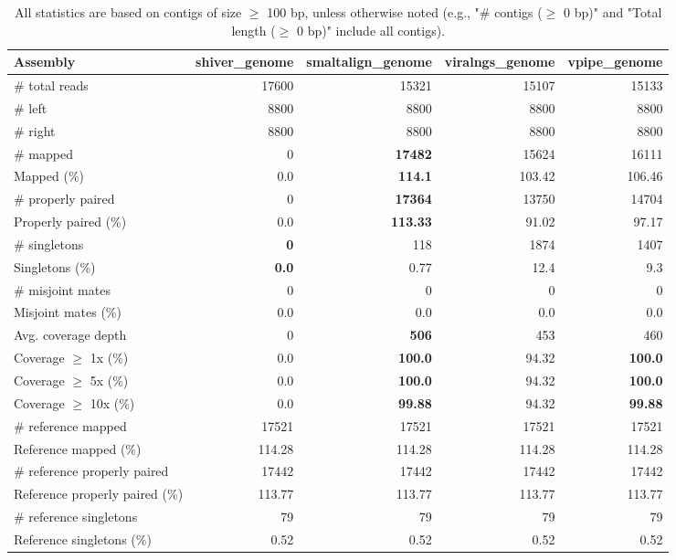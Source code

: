 \documentclass[12pt,a4paper]{article}
\begin{document}
\begin{table}[ht]
\begin{center}
\caption{All statistics are based on contigs of size $\geq$ 100 bp, unless otherwise noted (e.g., "\# contigs ($\geq$ 0 bp)" and "Total length ($\geq$ 0 bp)" include all contigs).}
\begin{tabular}{|l*{4}{|r}|}
\hline
Assembly & shiver\_genome & smaltalign\_genome & viralngs\_genome & vpipe\_genome \\ \hline
\# total reads & 17600 & 15321 & 15107 & 15133 \\ \hline
\# left & 8800 & 8800 & 8800 & 8800 \\ \hline
\# right & 8800 & 8800 & 8800 & 8800 \\ \hline
\# mapped & 0 & {\bf 17482} & 15624 & 16111 \\ \hline
Mapped (\%) & 0.0 & {\bf 114.1} & 103.42 & 106.46 \\ \hline
\# properly paired & 0 & {\bf 17364} & 13750 & 14704 \\ \hline
Properly paired (\%) & 0.0 & {\bf 113.33} & 91.02 & 97.17 \\ \hline
\# singletons & {\bf 0} & 118 & 1874 & 1407 \\ \hline
Singletons (\%) & {\bf 0.0} & 0.77 & 12.4 & 9.3 \\ \hline
\# misjoint mates & 0 & 0 & 0 & 0 \\ \hline
Misjoint mates (\%) & 0.0 & 0.0 & 0.0 & 0.0 \\ \hline
Avg. coverage depth & 0 & {\bf 506} & 453 & 460 \\ \hline
Coverage $\geq$ 1x (\%) & 0.0 & {\bf 100.0} & 94.32 & {\bf 100.0} \\ \hline
Coverage $\geq$ 5x (\%) & 0.0 & {\bf 100.0} & 94.32 & {\bf 100.0} \\ \hline
Coverage $\geq$ 10x (\%) & 0.0 & {\bf 99.88} & 94.32 & {\bf 99.88} \\ \hline
\# reference mapped & 17521 & 17521 & 17521 & 17521 \\ \hline
Reference mapped (\%) & 114.28 & 114.28 & 114.28 & 114.28 \\ \hline
\# reference properly paired & 17442 & 17442 & 17442 & 17442 \\ \hline
Reference properly paired (\%) & 113.77 & 113.77 & 113.77 & 113.77 \\ \hline
\# reference singletons & 79 & 79 & 79 & 79 \\ \hline
Reference singletons (\%) & 0.52 & 0.52 & 0.52 & 0.52 \\ \hline

\end{tabular}
\end{center}
\end{table}
\end{document}
